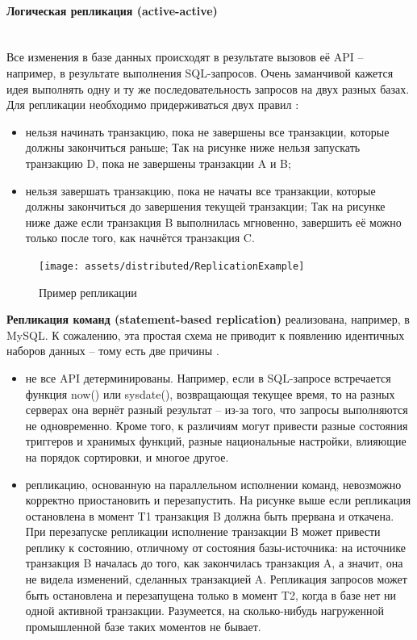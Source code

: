 \paragraph{Логическая репликация (active-active)} ~\\
Все изменения в базе данных происходят в результате вызовов её API – например, в результате выполнения SQL-запросов.
Очень заманчивой кажется идея выполнять одну и ту же последовательность запросов на двух разных базах. Для репликации
необходимо придерживаться двух правил \autocite{PhysLogPeplic}:
\begin{itemize}
    \item нельзя начинать транзакцию, пока не завершены все транзакции, которые должны закончиться раньше; Так на рисунке ниже нельзя запускать транзакцию D, пока не завершены транзакции A и B;
    \item нельзя завершать транзакцию, пока не начаты все транзакции, которые должны закончиться до завершения текущей транзакции; Так на рисунке ниже даже если транзакция B выполнилась мгновенно, завершить её можно только после того, как начнётся транзакция C.
\end{itemize}

\begin{figure}[H]
    \centering
    \texttt{[image: assets/distributed/ReplicationExample]}
    \caption{Пример репликации}
    \label{fig:ReplicationExample}
\end{figure}

\textbf{Репликация команд (statement-based replication)} реализована, например, в MySQL. К сожалению, эта простая схема не
приводит к появлению идентичных наборов данных – тому есть две причины \autocite{PhysLogPeplic}.
\begin{itemize}
    \item не все API детерминированы. Например, если в SQL-запросе встречается функция now() или sysdate(), возвращающая текущее время, то на разных серверах она вернёт разный результат – из-за того, что запросы выполняются не одновременно. Кроме того, к различиям могут привести разные состояния триггеров и хранимых функций, разные национальные настройки, влияющие на порядок сортировки, и многое другое.
    \item репликацию, основанную на параллельном исполнении команд, невозможно корректно приостановить и перезапустить. На рисунке выше если репликация остановлена в момент T1 транзакция B должна быть прервана и откачена. При перезапуске репликации исполнение транзакции B может привести реплику к состоянию, отличному от состояния базы-источника: на источнике транзакция B началась до того, как закончилась транзакция A, а значит, она не видела изменений, сделанных транзакцией A. Репликация запросов может быть остановлена и перезапущена только в момент T2, когда в базе нет ни одной активной транзакции. Разумеется, на сколько-нибудь нагруженной промышленной базе таких моментов не бывает.
\end{itemize}

